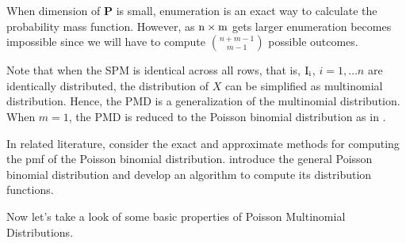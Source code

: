 \documentclass[12pt]{article}
\newcommand{\Pmat}{\mathbf{P}}
\newcommand{\PMD}{\textrm{PMD}}
\begin{document}
When dimension of $\Pmat$ is small, enumeration is an exact way to calculate the probability mass function. However, as $\rm n \times m$ gets larger enumeration becomes impossible since we will have to compute $\binom{n+m-1}{m-1}$ possible outcomes.


Note that when the SPM is identical across all rows, that is, $\rm I_{i}$, $i = 1, \dots n$ are identically distributed, the distribution of $X$ can be simplified as multinomial distribution. Hence, the $\PMD$ is a generalization of the multinomial distribution. When $m=1$, the $\PMD$ is reduced to the Poisson binomial distribution as in .

In related literature,  consider the exact and approximate methods for computing the pmf of the Poisson binomial distribution.  introduce the general Poisson binomial distribution and develop an algorithm to compute its distribution functions.

Now let's take a look of some basic properties of Poisson Multinomial Distributions.
\end{document}
